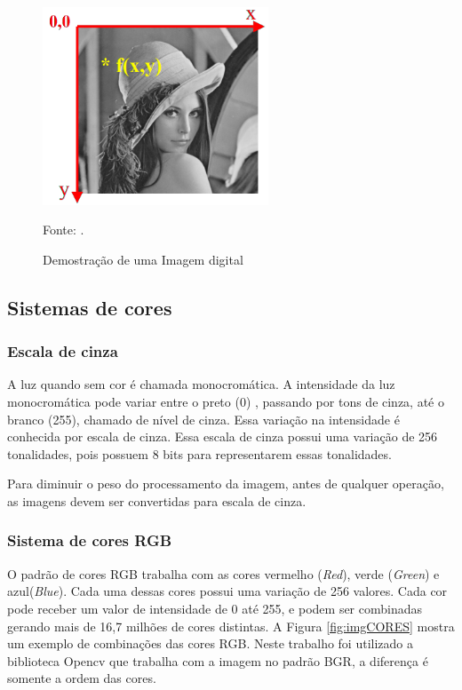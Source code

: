 \begin{figure}[H]
 \centering
 \includegraphics[width=0.60\textwidth]{./fig/fundamentacao/lenna}
 \caption{Demostração de uma Imagem digital}
  Fonte: \cite{imagemDigital2019}.
 \label{fig:imgDigital}
\end{figure}


\subsection{Sistemas de cores}
\label{sub:siscores}

\subsubsection{Escala de cinza}
\label{subsub:siscores-cinza}

A luz quando sem cor é chamada monocromática. A intensidade da luz monocromática pode variar entre o preto (0) , passando por tons de cinza, até o branco (255), chamado de nível de cinza. Essa variação na intensidade é conhecida por escala de cinza. 
Essa escala de cinza possui uma variação de 256 tonalidades, pois possuem 8 bits para representarem essas tonalidades. 

Para diminuir o peso do processamento da imagem, antes de qualquer operação, as imagens devem ser convertidas para escala de cinza.\cite{digitalImgProcess2010}


\subsubsection{Sistema de cores RGB}
\label{subsub:siscores-RGB}

O padrão de cores RGB trabalha com as cores   vermelho (\textit{Red}), verde (\textit{Green}) e  azul(\textit{Blue}). Cada uma dessas cores possui uma variação de 256 valores.  Cada cor pode receber um valor de intensidade de 0 até 255, e podem ser combinadas gerando mais de 16,7 milhões de cores distintas.  A Figura  \ref{fig:imgCORES} mostra um exemplo de combinações das cores RGB.  Neste trabalho foi utilizado a biblioteca Opencv que trabalha com a imagem no padrão BGR, a diferença é somente a ordem das cores.


